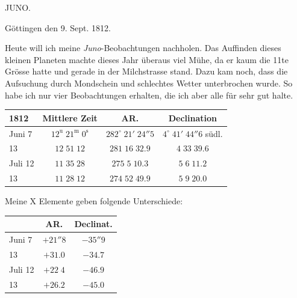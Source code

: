 \par{}\bigskip
\hypertarget{native-365-lower}{}\label{native-365-lower}
\begin{center}
\large JUNO.
\end{center}

\begin{flushright}Göttingen den 9. Sept. 1812.\end{flushright}
\par\indent Heute will ich meine \emph{Juno}-Beobachtungen nachholen. Das Auffinden
dieses kleinen Planeten machte dieses Jahr überaus viel Mühe, da er
kaum die 11te Grösse hatte und gerade in der Milchstrasse stand. Dazu kam
noch, dass die Aufsuchung durch Mondschein und schlechtes Wetter
unterbrochen wurde. So habe ich nur vier Beobachtungen erhalten, die ich
aber alle für sehr gut halte.

\begin{center}\fontsize{10}{12}\selectfont\setlength{\tabcolsep}{4pt}\renewcommand{\arraystretch}{1.15}\begin{tabular}{l|c|c|c}
1812 & Mittlere Zeit & AR. & Declination\\\hline
Juni 7 & $12^{\mathrm u}\;21^{\mathrm m}\;0^{\mathrm s}$ & $282^\circ\;21'\;24''5$ & $4^\circ\;41'\;44''6$ südl.\\
13 & $12\;51\;12$ & $281\;16\;32.9$ & $4\;33\;39.6$\\
Juli 12 & $11\;35\;28$ & $275\;5\;10.3$ & $5\;6\;11.2$\\
13 & $11\;28\;12$ & $274\;52\;49.9$ & $5\;9\;20.0$\\
\end{tabular}\end{center}

\par\indent Meine X Elemente geben folgende Unterschiede:

\begin{center}\fontsize{10}{12}\selectfont\setlength{\tabcolsep}{7pt}\renewcommand{\arraystretch}{1.15}\begin{tabular}{l|c|c}
& AR. & Declinat.\\\hline
Juni 7 & $+21''8$ & $-35''9$\\
13 & $+31.0$ & $-34.7$\\
Juli 12 & $+22\;4$ & $-46.9$\\
13 & $+26.2$ & $-45.0$\\
\end{tabular}\end{center}

